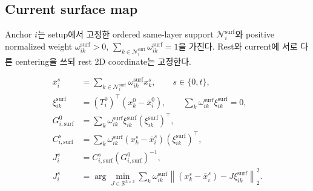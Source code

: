 \documentclass[11pt]{article}
\begin{document}
\subsection{Current surface map}

Anchor \(i\)는 setup에서 고정한 ordered same-layer support
\(\mathcal N_i^{\mathrm{surf}}\)와 positive normalized weight
\(\omega_{ik}^{\mathrm{surf}}>0\),
\(\sum_{k\in\mathcal N_i^{\mathrm{surf}}}\omega_{ik}^{\mathrm{surf}}=1\)을 가진다.
Rest와 current에 서로 다른 centering을 쓰되 rest 2D coordinate는 고정한다.

\begin{equation}
\begin{aligned}
  \bar x_i^s
  &=\sum_{k\in\mathcal N_i^{\mathrm{surf}}}
    \omega_{ik}^{\mathrm{surf}}x_k^s,
    \qquad s\in\{0,t\},\\
  \xi_{ik}^{\mathrm{surf}}
  &=(T_i^0)^\top(x_k^0-\bar x_i^0),
  \qquad
  \sum_k\omega_{ik}^{\mathrm{surf}}\xi_{ik}^{\mathrm{surf}}=0,\\
  G_{i,\mathrm{surf}}^0
  &=\sum_k\omega_{ik}^{\mathrm{surf}}
    \xi_{ik}^{\mathrm{surf}}(\xi_{ik}^{\mathrm{surf}})^\top,\\
  C_{i,\mathrm{surf}}^s
  &=\sum_k\omega_{ik}^{\mathrm{surf}}
    (x_k^s-\bar x_i^s)(\xi_{ik}^{\mathrm{surf}})^\top,\\
  J_i^s
  &=C_{i,\mathrm{surf}}^s(G_{i,\mathrm{surf}}^0)^{-1},\\
  J_i^s
  &=\arg\min_{J\in\mathbb R^{3\times2}}
    \sum_k\omega_{ik}^{\mathrm{surf}}
    \left\|(x_k^s-\bar x_i^s)-J\xi_{ik}^{\mathrm{surf}}\right\|_2^2.
\end{aligned}
  \label{eq:minimal-surface-tangent-fit}
\end{equation}
\end{document}
